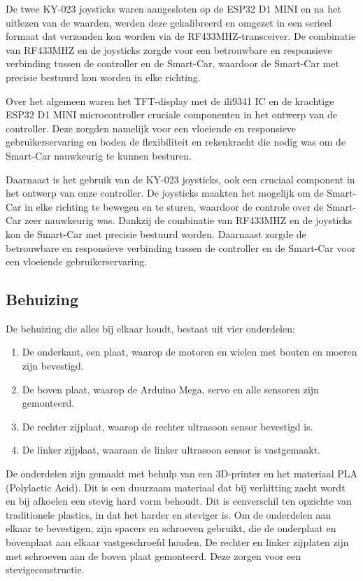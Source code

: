 De twee KY-023\cite{KY023} joysticks waren aangesloten op de ESP32\cite{ESP32} D1 MINI en na het uitlezen van de waarden, werden deze gekalibreerd en omgezet in een serieel formaat dat verzonden kon worden via de \gls{RF433MHZ}-transceiver. De combinatie van \gls{RF433MHZ} en de joysticks zorgde voor een betrouwbare en responsieve verbinding tussen de controller en de \gls{Smart-Car}, waardoor de \gls{Smart-Car} met precisie bestuurd kon worden in elke richting.

Over het algemeen waren het \gls{TFT-display} met de \gls{ili9341}\cite{ILI3941} IC en de krachtige ESP32\cite{ESP32} D1 MINI \gls{microcontroller} cruciale componenten in het ontwerp van de controller. Deze zorgden namelijk voor een vloeiende en responsieve gebruikerservaring en boden de flexibiliteit en rekenkracht die nodig was om de \gls{Smart-Car} nauwkeurig te kunnen besturen.

Daarnaast is het gebruik van de KY-023\cite{KY023} joysticks, ook een cruciaal component in het ontwerp van onze controller. De joysticks maakten het mogelijk om de \gls{Smart-Car} in elke richting te bewegen en te sturen, waardoor de controle over de \gls{Smart-Car} zeer nauwkeurig was. Dankzij de combinatie van \gls{RF433MHZ} en de joysticks kon de \gls{Smart-Car} met precisie bestuurd worden. Daarnaast zorgde de betrouwbare en responsieve verbinding tussen de controller en de \gls{Smart-Car} voor een vloeiende gebruikerservaring.

\subsection{Behuizing}
De behuizing die alles bij elkaar houdt, bestaat uit vier onderdelen:
\begin{enumerate}
\item De onderkant, een plaat, waarop de motoren en wielen met bouten en moeren zijn bevestigd.\item De boven plaat, waarop de Arduino Mega, servo en alle sensoren zijn gemonteerd.
\item De rechter zijplaat, waarop de rechter ultrasoon sensor bevestigd is.
\item De linker zijplaat, waaraan de linker ultrasoon sensor is vastgemaakt.
\end{enumerate}
De onderdelen zijn gemaakt met behulp van een 3D-printer en het materiaal PLA (Polylactic Acid). Dit is een duurzaam materiaal dat bij verhitting zacht wordt en bij afkoelen een stevig hard vorm behoudt. Dit is eenverschil ten opzichte van traditionele plastics, in dat het harder en steviger is. Om de onderdelen aan elkaar te bevestigen, zijn spacers en schroeven gebruikt, die de onderplaat en bovenplaat aan elkaar vastgeschroefd houden. De rechter en linker zijplaten zijn met schroeven aan de boven plaat gemonteerd. Deze zorgen voor een stevigeconstructie.
